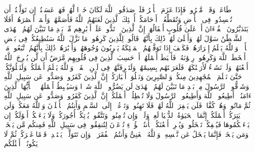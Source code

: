 \stopbuffer
\startbuffer[\q:47:21]
طَاعَةࣱ وَقَوۡلࣱ مَّعۡرُوفࣱۚ فَإِذَا عَزَمَ ٱلۡأَمۡرُ فَلَوۡ صَدَقُوا۟ ٱللَّهَ لَكَانَ خَیۡرࣰا لَّهُمۡ%
\stopbuffer
\startbuffer[\q:47:22]
فَهَلۡ عَسَیۡتُمۡ إِن تَوَلَّیۡتُمۡ أَن تُفۡسِدُوا۟ فِی ٱلۡأَرۡضِ وَتُقَطِّعُوۤا۟ أَرۡحَامَكُمۡ%
\stopbuffer
\startbuffer[\q:47:23]
أُو۟لَٰۤئِكَ ٱلَّذِینَ لَعَنَهُمُ ٱللَّهُ فَأَصَمَّهُمۡ وَأَعۡمَىٰۤ أَبۡصَٰرَهُمۡ%
\stopbuffer
\startbuffer[\q:47:24]
أَفَلَا یَتَدَبَّرُونَ ٱلۡقُرۡءَانَ أَمۡ عَلَىٰ قُلُوبٍ أَقۡفَالُهَاۤ%
\stopbuffer
\startbuffer[\q:47:25]
إِنَّ ٱلَّذِینَ ٱرۡتَدُّوا۟ عَلَىٰۤ أَدۡبَٰرِهِم مِّنۢ بَعۡدِ مَا تَبَیَّنَ لَهُمُ ٱلۡهُدَى ٱلشَّیۡطَٰنُ سَوَّلَ لَهُمۡ وَأَمۡلَىٰ لَهُمۡ%
\stopbuffer
\startbuffer[\q:47:26]
ذَٰلِكَ بِأَنَّهُمۡ قَالُوا۟ لِلَّذِینَ كَرِهُوا۟ مَا نَزَّلَ ٱللَّهُ سَنُطِیعُكُمۡ فِی بَعۡضِ ٱلۡأَمۡرِۖ وَٱللَّهُ یَعۡلَمُ إِسۡرَارَهُمۡ%
\stopbuffer
\startbuffer[\q:47:27]
فَكَیۡفَ إِذَا تَوَفَّتۡهُمُ ٱلۡمَلَٰۤئِكَةُ یَضۡرِبُونَ وُجُوهَهُمۡ وَأَدۡبَٰرَهُمۡ%
\stopbuffer
\startbuffer[\q:47:28]
ذَٰلِكَ بِأَنَّهُمُ ٱتَّبَعُوا۟ مَاۤ أَسۡخَطَ ٱللَّهَ وَكَرِهُوا۟ رِضۡوَٰنَهُۥ فَأَحۡبَطَ أَعۡمَٰلَهُمۡ%
\stopbuffer
\startbuffer[\q:47:29]
أَمۡ حَسِبَ ٱلَّذِینَ فِی قُلُوبِهِم مَّرَضٌ أَن لَّن یُخۡرِجَ ٱللَّهُ أَضۡغَٰنَهُمۡ%
\stopbuffer
\startbuffer[\q:47:30]
وَلَوۡ نَشَاۤءُ لَأَرَیۡنَٰكَهُمۡ فَلَعَرَفۡتَهُم بِسِیمَٰهُمۡۚ وَلَتَعۡرِفَنَّهُمۡ فِی لَحۡنِ ٱلۡقَوۡلِۚ وَٱللَّهُ یَعۡلَمُ أَعۡمَٰلَكُمۡ%
\stopbuffer
\startbuffer[\q:47:31]
وَلَنَبۡلُوَنَّكُمۡ حَتَّىٰ نَعۡلَمَ ٱلۡمُجَٰهِدِینَ مِنكُمۡ وَٱلصَّٰبِرِینَ وَنَبۡلُوَا۟ أَخۡبَارَكُمۡ%
\stopbuffer
\startbuffer[\q:47:32]
إِنَّ ٱلَّذِینَ كَفَرُوا۟ وَصَدُّوا۟ عَن سَبِیلِ ٱللَّهِ وَشَاۤقُّوا۟ ٱلرَّسُولَ مِنۢ بَعۡدِ مَا تَبَیَّنَ لَهُمُ ٱلۡهُدَىٰ لَن یَضُرُّوا۟ ٱللَّهَ شَیۡءࣰا وَسَیُحۡبِطُ أَعۡمَٰلَهُمۡ%
\stopbuffer
\startbuffer[\q:47:33]
۞ یَٰۤأَیُّهَا ٱلَّذِینَ ءَامَنُوۤا۟ أَطِیعُوا۟ ٱللَّهَ وَأَطِیعُوا۟ ٱلرَّسُولَ وَلَا تُبۡطِلُوۤا۟ أَعۡمَٰلَكُمۡ%
\stopbuffer
\startbuffer[\q:47:34]
إِنَّ ٱلَّذِینَ كَفَرُوا۟ وَصَدُّوا۟ عَن سَبِیلِ ٱللَّهِ ثُمَّ مَاتُوا۟ وَهُمۡ كُفَّارࣱ فَلَن یَغۡفِرَ ٱللَّهُ لَهُمۡ%
\stopbuffer
\startbuffer[\q:47:35]
فَلَا تَهِنُوا۟ وَتَدۡعُوۤا۟ إِلَى ٱلسَّلۡمِ وَأَنتُمُ ٱلۡأَعۡلَوۡنَ وَٱللَّهُ مَعَكُمۡ وَلَن یَتِرَكُمۡ أَعۡمَٰلَكُمۡ%
\stopbuffer
\startbuffer[\q:47:36]
إِنَّمَا ٱلۡحَیَوٰةُ ٱلدُّنۡیَا لَعِبࣱ وَلَهۡوࣱۚ وَإِن تُؤۡمِنُوا۟ وَتَتَّقُوا۟ یُؤۡتِكُمۡ أُجُورَكُمۡ وَلَا یَسۡءَلۡكُمۡ أَمۡوَٰلَكُمۡ%
\stopbuffer
\startbuffer[\q:47:37]
إِن یَسۡءَلۡكُمُوهَا فَیُحۡفِكُمۡ تَبۡخَلُوا۟ وَیُخۡرِجۡ أَضۡغَٰنَكُمۡ%
\stopbuffer
\startbuffer[\q:47:38]
هَٰۤأَنتُمۡ هَٰۤؤُلَاۤءِ تُدۡعَوۡنَ لِتُنفِقُوا۟ فِی سَبِیلِ ٱللَّهِ فَمِنكُم مَّن یَبۡخَلُۖ وَمَن یَبۡخَلۡ فَإِنَّمَا یَبۡخَلُ عَن نَّفۡسِهِۦۚ وَٱللَّهُ ٱلۡغَنِیُّ وَأَنتُمُ ٱلۡفُقَرَاۤءُۚ وَإِن تَتَوَلَّوۡا۟ یَسۡتَبۡدِلۡ قَوۡمًا غَیۡرَكُمۡ ثُمَّ لَا یَكُونُوۤا۟ أَمۡثَٰلَكُم%
